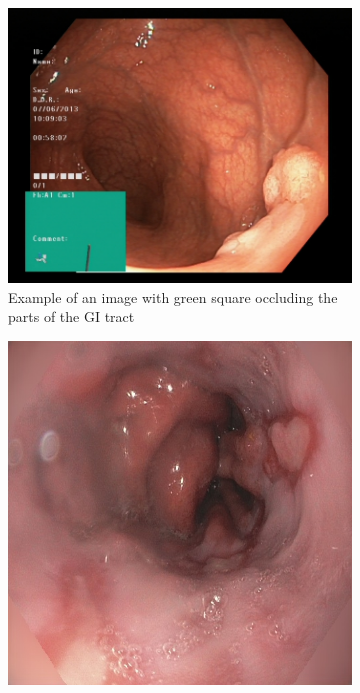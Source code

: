\begin{figure}
\begin{subfigure}[b]{0.4\textwidth}
         \includegraphics[height=\textwidth, width=\textwidth]{experiments/figures/greenframe.jpg}
         \caption{Example of an image with green square occluding the parts of the GI tract}
         \label{fig:GreenSquareOccluding}
     \end{subfigure}     
     \hfill
     \begin{subfigure}[t]{0.4\textwidth}
         \centering
         \includegraphics[height=\textwidth, width=\textwidth]{experiments/figures/noleftframe.jpg}

\end{subfigure}
\end{figure}

